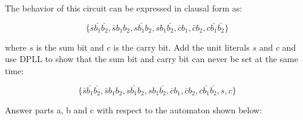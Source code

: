 \documentclass[addpoints]{exam}
\theoremstyle{definition}
\begin{document}
\begin{questions}
The behavior of this circuit can be expressed in clausal form as:

\[\{\bar{s}\bar{b_1}\bar{b_2},
  \bar{s}b_1b_2,s\bar{b_1}b_2,sb_1\bar{b_2},\bar{c}b_1,\bar{c}b_2,c\bar{b_1}\bar{b_2}\}\]

where $s$ is the sum bit and $c$ is the carry bit. Add the unit literals $s$ and
$c$ and use DPLL to show that the sum bit and carry bit can never be set at the
same time:

\[\{\bar{s}\bar{b_1}\bar{b_2},
  \bar{s}b_1b_2,s\bar{b_1}b_2,sb_1\bar{b_2},\bar{c}b_1,\bar{c}b_2,c\bar{b_1}\bar{b_2},s,c\}\]
\vspace{30mm}

\clearpage
\question Answer parts a, b and c with respect to the automaton shown below:

\end{questions}
\end{document}
